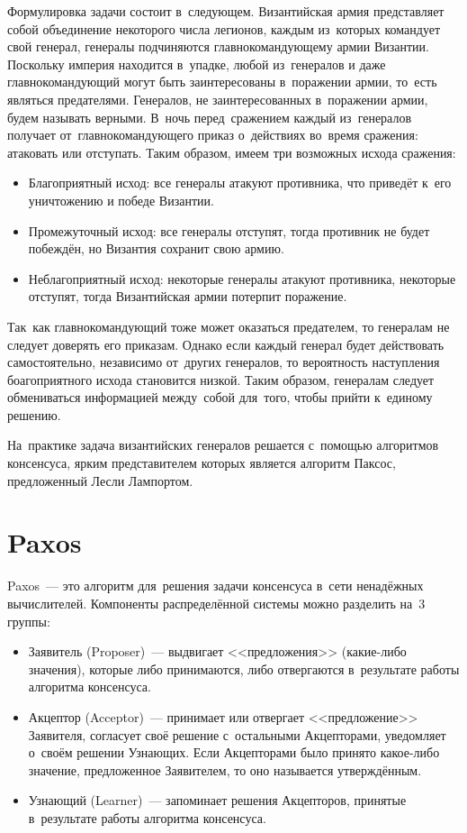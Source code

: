 Формулировка задачи состоит в~следующем. Византийская армия представляет собой объединение некоторого числа легионов, каждым из~которых командует свой генерал, генералы подчиняются главнокомандующему армии Византии. Поскольку империя находится в~упадке, любой из~генералов и даже главнокомандующий могут быть заинтересованы в~поражении армии, то~есть являться предателями. Генералов, не заинтересованных в~поражении армии, будем называть верными. В~ночь перед~сражением каждый из~генералов получает от~главнокомандующего приказ о~действиях во~время сражения: атаковать или отступать. Таким образом, имеем три возможных исхода сражения:
\begin{itemize}
	\item Благоприятный исход: все генералы атакуют противника, что приведёт к~его уничтожению и победе Византии.
	\item Промежуточный исход: все генералы отступят, тогда противник не будет побеждён, но Византия сохранит свою армию.
	\item Неблагоприятный исход: некоторые генералы атакуют противника, некоторые отступят, тогда Византийская армии потерпит поражение.
\end{itemize}

Так~как главнокомандующий тоже может оказаться предателем, то генералам не следует доверять его приказам. Однако если каждый генерал будет действовать самостоятельно, независимо от~других генералов, то вероятность наступления боагоприятного исхода становится низкой. Таким образом, генералам следует обмениваться информацией между~собой для~того, чтобы прийти к~единому решению.

На~практике задача византийских генералов решается с~помощью алгоритмов консенсуса, ярким представителем которых является алгоритм Паксос, предложенный Лесли Лампортом.

\section{Paxos}\label{sec:3}
Paxos~--- это алгоритм для~решения задачи консенсуса в~сети ненадёжных вычислителей. Компоненты распределённой системы можно разделить на~3 группы:
\begin{itemize}
	\item Заявитель (Proposer)~--- выдвигает <<предложения>> (какие-либо значения), которые либо принимаются, либо отвергаются в~результате работы алгоритма консенсуса.
	\item Акцептор (Acceptor)~--- принимает или отвергает <<предложение>> Заявителя, согласует своё решение с~остальными Акцепторами, уведомляет о~своём решении Узнающих. Если Акцепторами было принято какое-либо значение, предложенное Заявителем, то оно называется утверждённым.
	\item Узнающий (Learner)~--- запоминает решения Акцепторов, принятые в~результате работы алгоритма консенсуса.
\end{itemize}

